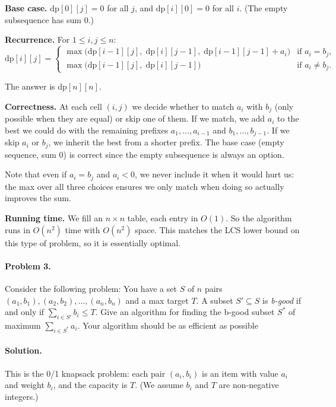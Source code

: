 \documentclass[10pt]{article}
\begin{document}
\textbf{Base case.}  $\text{dp}[0][j] = 0$ for all $j$, and $\text{dp}[i][0] = 0$ for all $i$.  (The empty subsequence has sum 0.)

\textbf{Recurrence.}  For $1 \leq i, j \leq n$:
\[
\text{dp}[i][j] = 
\begin{cases}
\max\!\big(\text{dp}[i-1][j],\; \text{dp}[i][j-1],\; \text{dp}[i-1][j-1] + a_i\big) & \text{if } a_i = b_j,\\[4pt]
\max\!\big(\text{dp}[i-1][j],\; \text{dp}[i][j-1]\big) & \text{if } a_i \neq b_j.
\end{cases}
\]

The answer is $\text{dp}[n][n]$.

\textbf{Correctness.}  At each cell $(i,j)$ we decide whether to match $a_i$ with $b_j$ (only possible when they are equal) or skip one of them.  If we match, we add $a_i$ to the best we could do with the remaining prefixes $a_1,\ldots,a_{i-1}$ and $b_1,\ldots,b_{j-1}$.  If we skip $a_i$ or $b_j$, we inherit the best from a shorter prefix.  The base case (empty sequence, sum 0) is correct since the empty subsequence is always an option.

Note that even if $a_i = b_j$ and $a_i < 0$, we never include it when it would hurt us: the max over all three choices ensures we only match when doing so actually improves the sum.

\textbf{Running time.}  We fill an $n \times n$ table, each entry in $O(1)$.  So the algorithm runs in $O(n^2)$ time with $O(n^2)$ space.  This matches the LCS lower bound on this type of problem, so it is essentially optimal.


\paragraph{Problem 3.} Consider the following problem:  You have a set $S$ of $n$ pairs $(a_1,b_1),(a_2,b_2),\dots,(a_n,b_n)$ and a max target $T$.  A subset $S' \subseteq S$ is \emph{b-good} if and only if $\sum_{i \in S'}{b_i} \leq T$.  Give an algorithm for finding the b-good subset $S^*$ of maximum $\sum_{i \in S^*}{a_i}$.  Your algorithm should be as efficient as possible 

\paragraph{Solution.}

This is the 0/1 knapsack problem: each pair $(a_i, b_i)$ is an item with value $a_i$ and weight $b_i$, and the capacity is $T$.  (We assume $b_i$ and $T$ are non-negative integers.)
\end{document}
